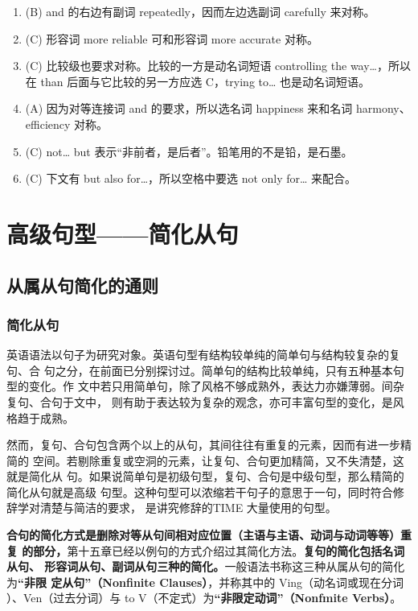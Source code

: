 \begin{enumerate}
\item (B) and 的右边有副词 repeatedly，因而左边选副词 carefully 来对称。

\item(C) 形容词 more reliable 可和形容词 more accurate 对称。

\item (C) 比较级也要求对称。比较的一方是动名词短语 controlling the way…，所以在 than 后面与它比较的另一方应选 C，trying to… 也是动名词短语。
\item (A) 因为对等连接词 and 的要求，所以选名词 happiness 来和名词 harmony、efficiency 对称。

\item  (C) not… but 表示“非前者，是后者”。铅笔用的不是铅，是石墨。

\item (C) 下文有 but also for…，所以空格中要选 not only for… 来配合。
\end{enumerate}


\part{高级句型——简化从句}

\chapter{从属从句简化的通则}

\section{简化从句}

英语语法以句子为研究对象。英语句型有结构较单纯的简单句与结构较复杂的复句、合
句之分，在前面已分别探讨过。简单句的结构比较单纯，只有五种基本句型的变化。作
文中若只用简单句，除了风格不够成熟外，表达力亦嫌薄弱。间杂复句、合句于文中，
则有助于表达较为复杂的观念，亦可丰富句型的变化，是风格趋于成熟。

然而，复句、合句包含两个以上的从句，其间往往有重复的元素，因而有进一步精简的
空间。若剔除重复或空洞的元素，让复句、合句更加精简，又不失清楚，这就是简化从
句。如果说简单句是初级句型，复句、合句是中级句型，那么精简的简化从句就是高级
句型。这种句型可以浓缩若干句子的意思于一句，同时符合修辞学对清楚与简洁的要求，
是讲究修辞的TIME 大量使用的句型。

\textbf{合句的简化方式是删除对等从句间相对应位置（主语与主语、动词与动词等等）重复
  的部分，}第十五章已经以例句的方式介绍过其简化方法。\textbf{复句的简化包括名词从句、
  形容词从句、副词从句三种的简化。}一般语法书称这三种从属从句的简化为\textbf{“非限
  定从句”（Nonfinite Clauses）}，并称其中的 Ving（动名词或现在分词
）、Ven（过去分词）与 to V（不定式）为\textbf{“非限定动词”（Nonfmite Verbs）}。

